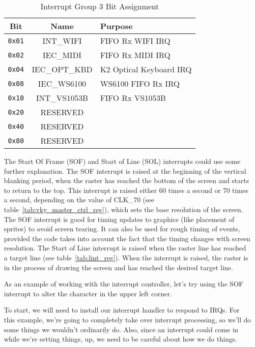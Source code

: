 \begin{table}[ht]
	\begin{center}
		\begin{tabular}{|c|c|l|} \hline
            Bit & Name & Purpose \\ \hline\hline
            \verb+0x01+ & INT\_WIFI & FIFO Rx WIFI IRQ \\ \hline
            \verb+0x02+ & IEC\_MIDI & FIFO Rx MIDI IRQ  \\ \hline
            \verb+0x04+ & IEC\_OPT\_KBD & K2 Optical Keyboard IRQ  \\ \hline
            \verb+0x08+ & IEC\_WS6100 & WS6100 FIFO Rx IRQ  \\ \hline
            \verb+0x10+ & INT\_VS1053B & FIFO Rx VS1053B  \\ \hline
            \verb+0x20+ & RESERVED & \\ \hline
            \verb+0x40+ & RESERVED & \\ \hline
            \verb+0x80+ & RESERVED & \\ \hline
        \end{tabular}
    \end{center}
	\caption{Interrupt Group 3 Bit Assignment}
	\label{tab:int_group_3}
\end{table}

The Start Of Frame (SOF) and Start of Line (SOL) interrupts could use some further explanation. The SOF interrupt is raised at the beginning of the vertical blanking period, when the raster has reached the bottom of the screen and starts to return to the top. This interrupt is raised either 60 times a second or 70 times a second, depending on the value of CLK\_70 (see table~\ref{tab:vky_master_ctrl_reg}), which sets the base resolution of the screen. The SOF interrupt is good for timing updates to graphics (like placement of sprites) to avoid screen tearing. It can also be used for rough timing of events, provided the code takes into account the fact that the timing changes with screen resolution. The Start of Line interrupt is raised when the raster line has reached a target line (see table~\ref{tab:lint_reg}). When the interrupt is raised, the raster is in the process of drawing the screen and has reached the desired target line.

As an example of working with the interrupt controller, let's try using the SOF interrupt to alter the character in the upper left corner.

To start, we will need to install our interrupt handler to respond to IRQs. For this example, we're going to completely take over interrupt processing, so we'll do some things we wouldn't ordinarily do. Also, since an interrupt could come in while we're setting things, up, we need to be careful about how we do things.

